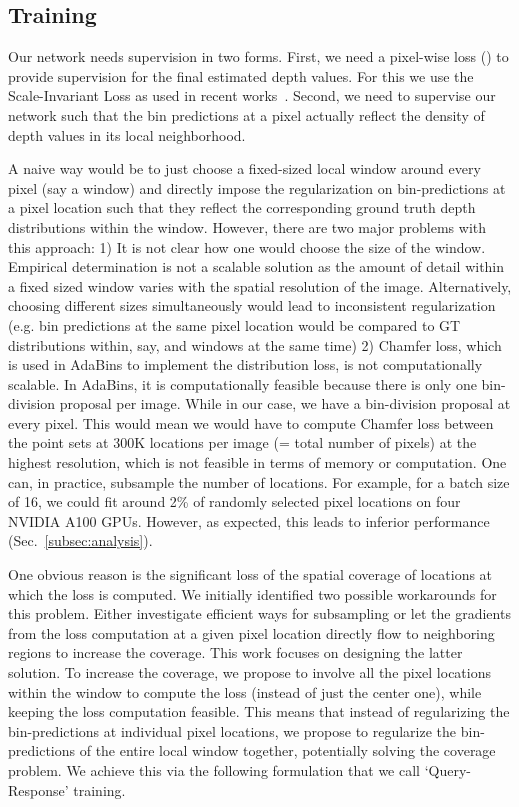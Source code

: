 \documentclass[runningheads]{llncs}
\begin{document}
\subsection{Training}


Our network needs supervision in two forms. First, we need a pixel-wise loss () to provide supervision for the final estimated depth values. For this we use the Scale-Invariant Loss as used in recent works~\cite{Bhat2021,bts_lee2019big}. Second, we need to supervise our network such that the bin predictions at a pixel actually reflect the density of depth values in its local neighborhood. 

A naive way would be to just choose a fixed-sized local window around every pixel (say a  window) and directly impose the regularization on bin-predictions at a pixel location such that they reflect the corresponding ground truth depth distributions within the window. However, there are two major problems with this approach: 1) It is not clear how one would choose the size of the window. Empirical determination is not a scalable solution as the amount of detail within a fixed sized window varies with the spatial resolution of the image. Alternatively, choosing different sizes simultaneously would lead to inconsistent regularization (e.g. bin predictions at the same pixel location would be compared to GT distributions within, say,  and  windows at the same time) 2) Chamfer loss, which is used in AdaBins to implement the distribution loss, is not computationally scalable. In AdaBins, it is computationally feasible because there is only one bin-division proposal per image. While in our case, we have a bin-division proposal at every pixel. This would mean we would have to compute Chamfer loss between the point sets at 300K locations per image (= total number of pixels) at the highest resolution, which is not feasible in terms of memory or computation. One can, in practice, subsample the number of locations. For example, for a batch size of 16, we could fit around 2\% of randomly selected pixel locations on four NVIDIA A100 GPUs. However, as expected, this leads to inferior performance (Sec.~\ref{subsec:analysis}). 

One obvious reason is the significant loss of the spatial coverage of locations at which the loss is computed. We initially identified two possible workarounds for this problem. Either investigate efficient ways for subsampling or let the gradients from the loss computation at a given pixel location directly flow to neighboring regions to increase the coverage. This work focuses on designing the latter solution. To increase the coverage, we propose to involve all the pixel locations within the window to compute the loss (instead of just the center one), while keeping the loss computation feasible. This means that instead of regularizing the bin-predictions at individual pixel locations, we propose to regularize the bin-predictions of the entire local window together, potentially solving the coverage problem. We achieve this via the following formulation that we call `Query-Response' training.
\end{document}
